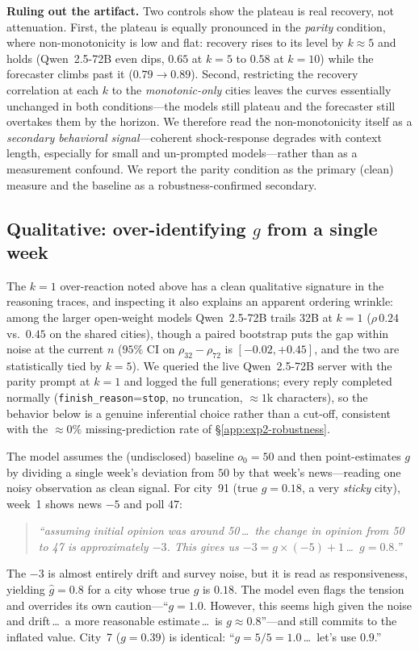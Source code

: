 \documentclass{article} %
\begin{document}
\textbf{Ruling out the artifact.}  Two controls show the plateau is real recovery, not attenuation.
First, the plateau is equally pronounced in the \emph{parity} condition, where non-monotonicity is
low and flat: recovery rises to its level by $k\approx5$ and holds (Qwen~2.5-72B even dips, $0.65$ at
$k=5$ to $0.58$ at $k=10$) while the forecaster climbs past it ($0.79\!\to\!0.89$).  Second,
restricting the recovery correlation at each $k$ to the \emph{monotonic-only} cities leaves the
curves essentially unchanged in both conditions---the models still plateau and the forecaster still
overtakes them by the horizon.  We therefore read the non-monotonicity itself as a
\emph{secondary behavioral signal}---coherent shock-response degrades with context length,
especially for small and un-prompted models---rather than as a measurement confound.  We report the
parity condition as the primary (clean) measure and the baseline as a robustness-confirmed
secondary.

\subsection{Qualitative: over-identifying \texorpdfstring{$g$}{g} from a single week}
\label{app:exp2-traces}

The $k{=}1$ over-reaction noted above has a clean qualitative signature in the reasoning traces, and
inspecting it also explains an apparent ordering wrinkle: among the larger open-weight models
Qwen~2.5-72B trails 32B at $k{=}1$ ($\rho\,0.24$ vs.\ $0.45$ on the shared cities), though a paired
bootstrap puts the gap within noise at the current $n$ ($95\%$ CI on $\rho_{32}-\rho_{72}$ is
$[-0.02,+0.45]$, and the two are statistically tied by $k{=}5$). We queried the live Qwen~2.5-72B
server with the parity prompt at $k{=}1$ and logged the full generations; every reply completed
normally (\texttt{finish\_reason}{=}\texttt{stop}, no truncation, $\approx1$k characters), so the
behavior below is a genuine inferential choice rather than a cut-off, consistent with the
$\approx0\%$ missing-prediction rate of \S\ref{app:exp2-robustness}.

The model assumes the (undisclosed) baseline $o_0{=}50$ and then point-estimates $g$ by dividing a
single week's deviation from $50$ by that week's news---reading one noisy observation as clean
signal. For city~91 (true $g{=}0.18$, a very \emph{sticky} city), week~1 shows news $-5$ and poll
$47$:
\begin{quote}\small\itshape
``assuming initial opinion was around 50\,\ldots\ the change in opinion from 50 to 47 is approximately
$-3$. This gives us $-3 = g\times(-5)+1$\,\ldots\ $g = 0.8$.''
\end{quote}
The $-3$ is almost entirely drift and survey noise, but it is read as responsiveness, yielding
$\hat g{=}0.8$ for a city whose true $g$ is $0.18$. The model even flags the tension and overrides
its own caution---``$g = 1.0$. However, this seems high given the noise and drift\,\ldots\ a more
reasonable estimate\,\ldots\ is $g \approx 0.8$''---and still commits to the inflated value. City~7
($g{=}0.39$) is identical: ``$g = 5/5 = 1.0$\,\ldots\ let's use $0.9$.''
\end{document}
